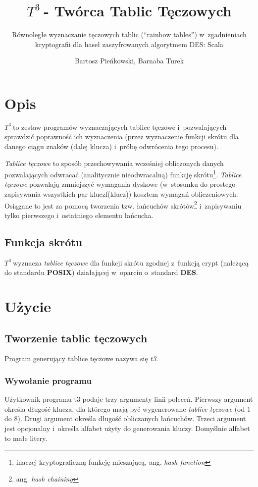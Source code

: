 \documentclass{scrartcl}
\begin{document}
\sloppy

\newcommand{\ttt}{$T^3\:$}

\title{\ttt - Twórca Tablic Tęczowych}
\subtitle{Równoległe wyznaczanie tęczowych tablic (``rainbow tables'') w~zgadnieniach kryptografii dla haseł zaszyfrowanych algorytmem DES: Scala}
\author{Bartosz Pieńkowski, Barnaba Turek}
\maketitle
\section{Opis}
\ttt to zestaw programów wyznaczających tablice tęczowe i~pozwalających sprawdzić poprawność ich wyznaczenia (przez wyznaczenie funkcji skrótu dla danego ciągu znaków (dalej klucza) i~próbę odwrócenia tego procesu).

\emph{Tablice tęczowe} to sposób przechowywania wcześniej obliczonych danych pozwalających odwracać (analitycznie nieodwracalną) funkcję skrótu\footnote{inaczej kryptograficzną funkcję mieszającą, ang. \emph{hash function}}.
\emph{Tablice tęczowe} pozwalają zmniejszyć wymagania dyskowe (w~stosunku do prostego zapisywania wszystkich par klucz\dywiz f(klucz)) kosztem wymagań obliczeniowych.
Osiągane to jest za pomocą tworzenia tzw. łańcuchów skrótów\footnote{ang. \emph{hash chaining}} i~zapisywaniu tylko pierwszego i~ostatniego elementu łańcucha.

\subsection{Funkcja skrótu}
\ttt wyznacza \emph{tablice tęczowe} dla funkcji skrótu zgodnej z~funkcją crypt (należącą do standardu \textbf{POSIX}) działającej w~oparciu o~standard \textbf{DES}.

\section{Użycie}
\subsection{Tworzenie tablic tęczowych}
Program generujący tablice tęczowe nazywa się \emph{t3}.

\subsubsection{Wywołanie programu}
Użytkownik programu t3 podaje trzy argumenty linii poleceń. Pierwszy argument określa długość klucza, dla którego mają być wygenerowane \emph{tablice tęczowe} (od 1 do 8).
Drugi argument określa długość obliczanych łańcuchów.
Trzeci argument jest opcjonalny i~określa alfabet użyty do generowania kluczy. Domyślnie alfabet to małe litery.
\end{document}
